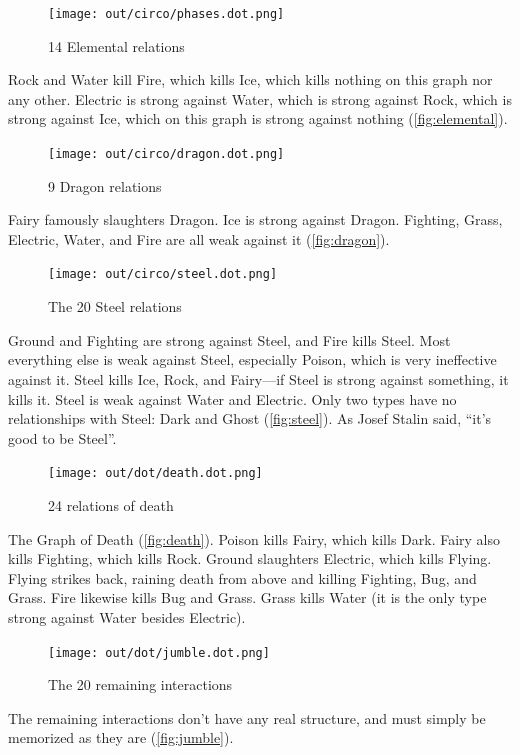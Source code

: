 \begin{figure}[ht]
\centering
    \texttt{[image: out/circo/phases.dot.png]}
    \caption{14 Elemental relations}
    \label{fig:elemental}
\end{figure}
\noindent{}Rock and Water kill Fire, which kills Ice, which kills nothing on this graph nor any other.
Electric is strong against Water, which is strong against Rock, which is strong against Ice,
 which on this graph is strong against nothing (\autoref{fig:elemental}).
\clearpage

\begin{figure}[t!]
\centering
\texttt{[image: out/circo/dragon.dot.png]}
\caption{9 Dragon relations}
\label{fig:dragon}
\end{figure}
\noindent{}Fairy famously slaughters Dragon.
Ice is strong against Dragon.
Fighting, Grass, Electric, Water, and Fire are all weak against it (\autoref{fig:dragon}).

\begin{figure}[h!]
\centering
\texttt{[image: out/circo/steel.dot.png]}
\caption{The 20 Steel relations}
\label{fig:steel}
\end{figure}
\noindent{}Ground and Fighting are strong against Steel, and Fire kills Steel.
Most everything else is weak against Steel, especially
 Poison, which is very ineffective against it.
Steel kills Ice, Rock, and Fairy---if Steel is strong against something, it kills it.
Steel is weak against Water and Electric.
Only two types have no relationships with Steel: Dark and Ghost (\autoref{fig:steel}).
As Josef Stalin said, ``it's good to be Steel''.

\begin{figure}[h!]
\centering
\texttt{[image: out/dot/death.dot.png]}
\caption{24 relations of death}
\label{fig:death}
\end{figure}
\noindent{}The Graph of Death (\autoref{fig:death}).
Poison kills Fairy, which kills Dark.
Fairy also kills Fighting, which kills Rock.
Ground slaughters Electric, which kills Flying.
Flying strikes back, raining death from above and killing Fighting, Bug, and Grass.
Fire likewise kills Bug and Grass.
Grass kills Water (it is the only type strong against Water besides Electric).

\begin{figure}[ht]
\centering
\texttt{[image: out/dot/jumble.dot.png]}
\caption{The 20 remaining interactions}
\label{fig:jumble}
\end{figure}
The remaining interactions don't have any real structure, and must simply be
memorized as they are (\autoref{fig:jumble}).

